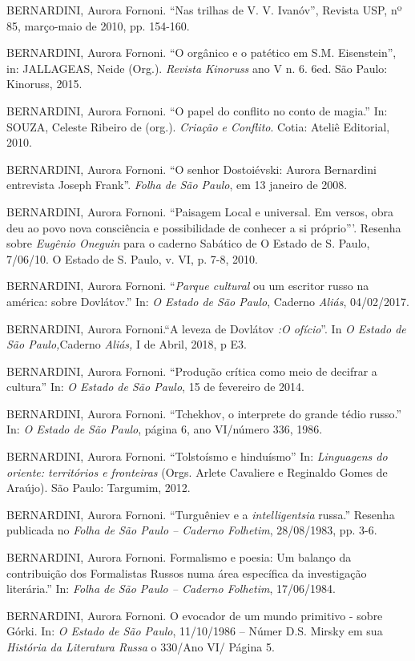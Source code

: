 BERNARDINI, Aurora Fornoni. ``Nas trilhas de V. V. Ivanóv'', Revista
USP, nº 85, março-maio de 2010, pp. 154-160.

BERNARDINI, Aurora Fornoni. ``O orgânico e o patético em S.M.
Eisenstein'', in: JALLAGEAS, Neide (Org.). \emph{Revista Kinoruss} ano V
n. 6. 6ed. São Paulo: Kinoruss, 2015.

BERNARDINI, Aurora Fornoni. ``O papel do conflito no conto de magia.''
In: SOUZA, Celeste Ribeiro de (org.). \emph{Criação e Conflito}. Cotia:
Ateliê Editorial, 2010.

BERNARDINI, Aurora Fornoni. ``O senhor Dostoiévski: Aurora Bernardini
entrevista Joseph Frank''. \emph{Folha de São Paulo}, em 13 janeiro de
2008.

BERNARDINI, Aurora Fornoni. ``Paisagem Local e universal. Em versos,
obra deu ao povo nova consciência e possibilidade de conhecer a si
próprio'''. Resenha sobre \emph{Eugênio Oneguin} para o caderno Sabático
de O Estado de S. Paulo, 7/06/10. O Estado de S. Paulo, v. VI, p. 7-8,
2010.

BERNARDINI, Aurora Fornoni. ``\emph{Parque cultural} ou um escritor
russo na américa: sobre Dovlátov.'' In: \emph{O Estado de São Paulo},
Caderno \emph{Aliás}, 04/02/2017.

BERNARDINI, Aurora Fornoni.``A leveza de Dovlátov \emph{:O ofício}''. In
\emph{O Estado de São Paulo,}Caderno \emph{Aliás,} I de Abril, 2018, p
E3.

BERNARDINI, Aurora Fornoni. ``Produção crítica como meio de decifrar a
cultura'' In: \emph{O Estado de São Paulo}, 15 de fevereiro de 2014.

BERNARDINI, Aurora Fornoni. ``Tchekhov, o interprete do grande tédio
russo.'' In: \emph{O Estado de São Paulo}, página 6, ano VI/número 336,
1986.

BERNARDINI, Aurora Fornoni. ``Tolstoísmo e hinduísmo'' In:
\emph{Linguagens do oriente: territórios e fronteiras} (Orgs. Arlete
Cavaliere e Reginaldo Gomes de Araújo). São Paulo: Targumim, 2012.

BERNARDINI, Aurora Fornoni. ``Turguêniev e a \emph{intelligentsia}
russa.'' Resenha publicada no \emph{Folha de São Paulo -- Caderno
Folhetim}, 28/08/1983, pp. 3-6.

BERNARDINI, Aurora Fornoni. Formalismo e poesia: Um balanço da
contribuição dos Formalistas Russos numa área específica da investigação
literária.'' In: \emph{Folha de São Paulo -- Caderno Folhetim},
17/06/1984.

BERNARDINI, Aurora Fornoni. O evocador de um mundo primitivo - sobre
Górki. In: \emph{O Estado de São Paulo}, 11/10/1986 -- Númer D.S. Mirsky
em sua \emph{História da Literatura Russa} o 330/Ano VI/ Página 5.

